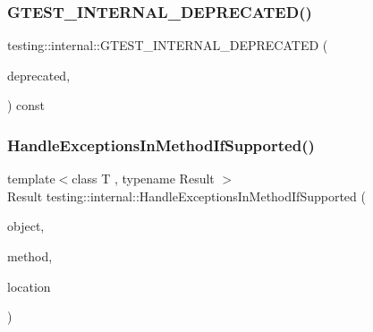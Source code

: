 \subsubsection{\texorpdfstring{GTEST\_INTERNAL\_DEPRECATED()}{GTEST\_INTERNAL\_DEPRECATED()}\hspace{0.1cm}{\footnotesize\ttfamily [5/5]}}
{\footnotesize\ttfamily testing\+::internal\+::\+G\+T\+E\+S\+T\+\_\+\+I\+N\+T\+E\+R\+N\+A\+L\+\_\+\+D\+E\+P\+R\+E\+C\+A\+T\+ED (\begin{DoxyParamCaption}\item[{\char`\"{}I\+N\+S\+T\+A\+N\+T\+I\+A\+T\+E\+\_\+\+T\+Y\+P\+E\+D\+\_\+\+T\+E\+S\+T\+\_\+\+C\+A\+S\+E\+\_\+P is}]{deprecated,  }\item[{please use \char`\"{} \char`\"{}\mbox{\hyperlink{namespacetesting_abc73aa914fde88c645367f862dbe81dd}{I\+N\+S\+T\+A\+N\+T\+I\+A\+T\+E\+\_\+\+T\+Y\+P\+E\+D\+\_\+\+T\+E\+S\+T\+\_\+\+S\+U\+I\+T\+E\+\_\+P}}\char`\"{}}]{ }\end{DoxyParamCaption}) const}

\mbox{\label{namespacetesting_1_1internal_addb2ed165b92b74e25fe9ebe9e46b9f9}} 
\subsubsection{\texorpdfstring{HandleExceptionsInMethodIfSupported()}{HandleExceptionsInMethodIfSupported()}}
{\footnotesize\ttfamily template$<$class T , typename Result $>$ \\
Result testing\+::internal\+::\+Handle\+Exceptions\+In\+Method\+If\+Supported (\begin{DoxyParamCaption}\item[{T $\ast$}]{object,  }\item[{Result(T\+::$\ast$)()}]{method,  }\item[{const char $\ast$}]{location }\end{DoxyParamCaption})}

\mbox{\label{namespacetesting_1_1internal_ac5293b438139ef7ed05cb7fcaaf63545}} 
